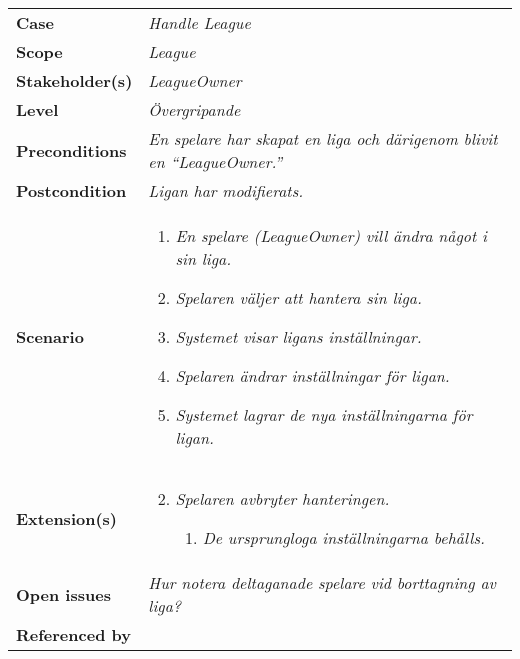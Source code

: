 \documentclass{article}
\begin{document}
    \begin{tabular}{l p{10cm}}
        \textbf{Case}           & \textit{Handle League}          \\
        \textbf{Scope}          & \textit{League}                 \\
        \textbf{Stakeholder(s)} & \textit{LeagueOwner}            \\
        \textbf{Level}          & \textit{Övergripande}           \\
        \textbf{Preconditions}  & \textit{En spelare har skapat en liga och
                                          därigenom blivit en
                                          ``LeagueOwner.''}       \\
        \textbf{Postcondition}  & \textit{Ligan har modifierats.} \\
        \textbf{Scenario}       &
            \begin{enumerate}
                \item \textit{En spelare (LeagueOwner) vill ändra något i sin
                              liga.}
                \item \textit{Spelaren väljer att hantera sin liga.}
                \item \textit{Systemet visar ligans inställningar.}
                \item \textit{Spelaren ändrar inställningar för ligan.}
                \item \textit{Systemet lagrar de nya inställningarna för ligan.}
            \end{enumerate}                                       \\
        \textbf{Extension(s)}   &
            \begin{enumerate}
            \setcounter{enumi}{1}
                \item \textit{Spelaren avbryter hanteringen.}
                    \begin{enumerate}
                        \item \textit{De ursprungloga inställningarna behålls.}
                    \end{enumerate}
            \end{enumerate}                                       \\
        \textbf{Open issues}    & \textit{Hur notera deltaganade spelare vid
                                          borttagning av liga?}   \\
        \textbf{Referenced by}  & \textit{}
    \end{tabular}
\end{document}
